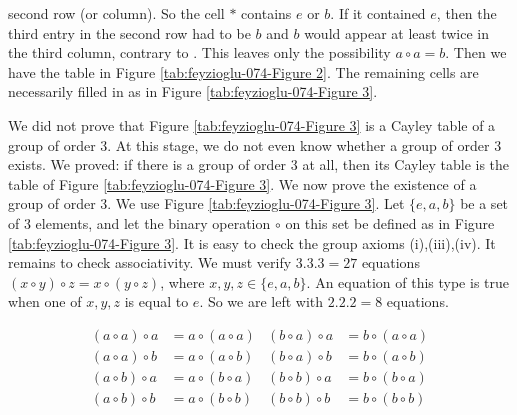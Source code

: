\documentclass[11pt]{amsbook}
\begin{document}
second row (or column). So the cell $*$ contains $e$ or $b$. If it contained $e$, then the third entry in the second row had to be $b$ and $b$ would appear at least twice in the third column, contrary to . This leaves only the possibility $a \circ a = b$. Then we have the table in Figure \ref{tab:feyzioglu-074-Figure 2}. The remaining cells are necessarily filled in as in Figure \ref{tab:feyzioglu-074-Figure 3}.

We did not prove that Figure \ref{tab:feyzioglu-074-Figure 3} is a Cayley table of a group of order 3. At this stage, we do not even know whether a group of order 3 exists. We proved: if there is a group of order 3 at all, then its Cayley table is the table of Figure \ref{tab:feyzioglu-074-Figure 3}. We now prove the existence of a group of order 3. We use Figure \ref{tab:feyzioglu-074-Figure 3}. Let $\{e,a,b\}$ be a set of 3 elements, and let the binary operation $\circ$ on this set be defined as in Figure \ref{tab:feyzioglu-074-Figure 3}. It is easy to check the group axioms (i),(iii),(iv). It remains to check associativity. We must verify $3.3.3 = 27$ equations $(x \circ y) \circ z = x \circ (y \circ z)$, where $x,y,z \in \{e,a,b\}$. An equation of this type is true when one of $x,y,z$ is equal to $e$. So we are left with $2.2.2 = 8$ equations.

\begin{align*}
    (a \circ a) \circ a &= a \circ (a \circ a) & (b \circ a) \circ a &= b \circ (a \circ a) \\
    (a \circ a) \circ b &= a \circ (a \circ b) & (b \circ a) \circ b &= b \circ (a \circ b) \\
    (a \circ b) \circ a &= a \circ (b \circ a) & (b \circ b) \circ a &= b \circ (b \circ a) \\
    (a \circ b) \circ b &= a \circ (b \circ b) & (b \circ b) \circ b &= b \circ (b \circ b)
\end{align*}
\end{document}
